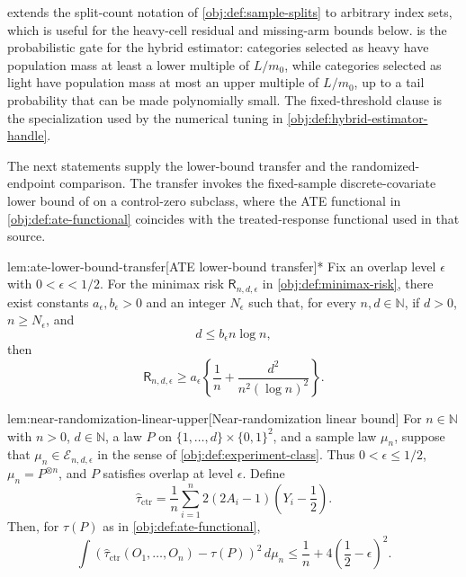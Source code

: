 extends the split-count notation of \cref{obj:def:sample-splits} to arbitrary index sets, which is useful for the heavy-cell residual and missing-arm bounds below.  is the probabilistic gate for the hybrid estimator: categories selected as heavy have population mass at least a lower multiple of \(L/m_0\), while categories selected as light have population mass at most an upper multiple of \(L/m_0\), up to a tail probability that can be made polynomially small. The fixed-threshold clause is the specialization used by the numerical tuning in \cref{obj:def:hybrid-estimator-handle}.

The next statements supply the lower-bound transfer and the randomized-endpoint comparison. The transfer invokes the fixed-sample discrete-covariate lower bound of \citet{ZengBalakrishnanHanKennedy2024} on a control-zero subclass, where the ATE functional in \cref{obj:def:ate-functional} coincides with the treated-response functional used in that source.

\begin{lemmav}{lem:ate-lower-bound-transfer}[ATE lower-bound transfer]*
Fix an overlap level \(\epsilon\) with \(0<\epsilon<1/2\). For the minimax risk \(\mathsf R_{n,d,\epsilon}\) in \cref{obj:def:minimax-risk}, there exist constants \(a_\epsilon,b_\epsilon>0\) and an integer \(N_\epsilon\) such that, for every \(n,d\in\mathbb N\), if \(d>0\), \(n\ge N_\epsilon\), and
\[
d\le b_\epsilon n\log n,
\]
then
\[
\mathsf R_{n,d,\epsilon}
\ge
a_\epsilon\left\{\frac1n+\frac{d^2}{n^2(\log n)^2}\right\}.
\]
\end{lemmav}

\begin{lemmav}{lem:near-randomization-linear-upper}[Near-randomization linear bound]
For \(n\in\mathbb N\) with \(n>0\), \(d\in\mathbb N\), a law \(P\) on \(\{1,\ldots,d\}\times\{0,1\}^2\), and a sample law \(\mu_n\), suppose that \(\mu_n\in\mathcal E_{n,d,\epsilon}\) in the sense of \cref{obj:def:experiment-class}. Thus \(0<\epsilon\le 1/2\), \(\mu_n=P^{\otimes n}\), and \(P\) satisfies overlap at level \(\epsilon\). Define
\[
\widehat\tau_{\mathrm{ctr}}
=
\frac1n\sum_{i=1}^n
2(2A_i-1)\left(Y_i-\frac12\right).
\]
Then, for \(\tau(P)\) as in \cref{obj:def:ate-functional},
\[
\int
\left(\widehat\tau_{\mathrm{ctr}}(O_1,\ldots,O_n)-\tau(P)\right)^2
\,d\mu_n
\le
\frac1n+4\left(\frac12-\epsilon\right)^2 .
\]
\end{lemmav}

